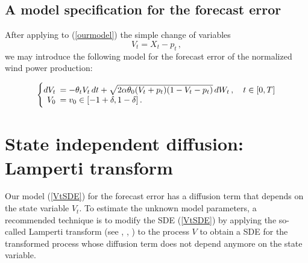 \documentclass[11pt]{article}
\theoremstyle{definition}
\begin{document}


\subsection{A model specification for the forecast error}
 After applying to (\ref{ourmodel}) the simple change of variables $$V_t = X_t - p_t \,,$$ we may introduce the following model for the forecast error of the normalized wind power production: 

\begin{equation}
  \left\{
  \begin{array}{@{}rl@{}}
    dV_t \!\!\!&=  - \theta_t V_t  \, dt + \sqrt{2 \alpha \theta_0 (V_t +p_t ) (1-V_t-p_t)} \, dW_t\,, \quad t \in [0,T]  \\
   V_0  \!\!\!&=  v_0\in [-1 + \delta,1 - \delta] \,.
 \end{array}\right.  \label{VtSDE}
\end{equation}




\section{State independent diffusion: Lamperti transform} \label{Section_3}

Our model (\ref{VtSDE}) for the forecast error has a diffusion term that depends on the state variable $V_t$. To estimate the unknown model parameters, a recommended technique is to modify the SDE (\ref{VtSDE}) by applying the so-called Lamperti transform (see \cite[40--41]{iacus1}, \cite{moma}, \cite[98--100]{saso}) to the process $V$ to obtain a SDE for the transformed process whose diffusion term does not depend anymore on the state variable. \\
\end{document}

